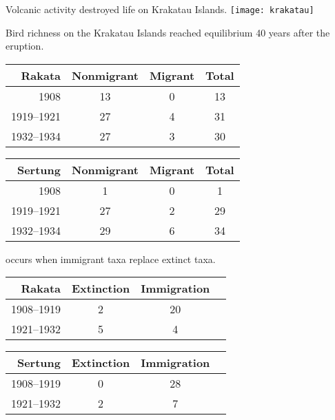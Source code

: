 \documentclass[t,handout]{beamer}  %
\begin{document}
\begin{frame}{Volcanic activity destroyed life on Krakatau Islands.}
	\centering
		\texttt{[image: krakatau]}
\end{frame}

\begin{frame}{Bird richness on the Krakatau Islands reached equilibrium 40 years after the eruption.}
	\centering
	\begin{tabular}{rccc}
		\toprule
		\textbf{Rakata} & Nonmigrant & Migrant & Total\\
		\midrule
		1908 & 13 & 0 & 13 \\
		1919--1921 & 27 & 4 & 31 \\
		1932--1934 & 27 & 3 & 30 \\
		\bottomrule
	\end{tabular}
	
	\vspace{1\baselineskip}
	
	\begin{tabular}{rccc}
		\toprule
		\textbf{Sertung}& Nonmigrant & Migrant & Total\\
		\midrule
		1908 & 1 & 0 & 1 \\
		1919--1921 & 27 & 2 & 29\\
		1932--1934 & 29 & 6 & 34\\
		\bottomrule
	\end{tabular}
\end{frame}

\begin{frame}{ occurs when immigrant taxa replace extinct taxa.}
	\centering
	\begin{tabular}{rccc}
		\toprule
		\textbf{Rakata} & Extinction & Immigration\\
		\midrule
		1908--1919 & 2 & 20 \\
		1921--1932 & 5 & 4  \\
		\bottomrule
	\end{tabular}

	\vspace{1\baselineskip}

	\begin{tabular}{rccc}
		\toprule
		\textbf{Sertung}& Extinction & Immigration\\
		\midrule
		1908--1919 & 0 & 28 \\
		1921--1932 & 2 & 7  \\
		\bottomrule
	\end{tabular}


		
\end{frame}
\end{document}
